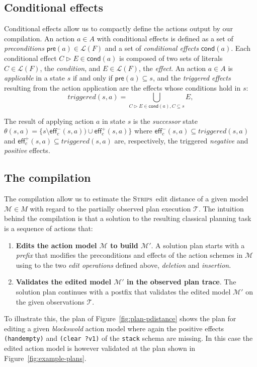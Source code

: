\documentclass[letterpaper]{article} %
\newcommand{\pre}{\mathsf{pre}}     %
\newcommand{\eff}{\mathsf{eff}}     %
\newcommand{\cond}{\mathsf{cond}}   %
\newcommand{\strips}{\textsc{Strips}}     %
\begin{document}
\subsection{Conditional effects}
Conditional effects allow us to compactly define the actions output by our compilation. An action $a\in A$ with conditional effects is defined as a set of {\em preconditions} $\pre(a)\in\mathcal{L}(F)$ and a set of {\em conditional effects} $\cond(a)$. Each conditional effect $C\rhd E\in\cond(a)$ is composed of two sets of literals $C\in\mathcal{L}(F)$, the {\em condition}, and $E\in\mathcal{L}(F)$, the {\em effect}. An action $a\in A$ is {\em applicable} in a state $s$ if and only if $\pre(a)\subseteq s$, and the {\em triggered effects} resulting from the action application are the effects whose conditions hold in $s$:
\[
triggered(s,a)=\bigcup_{C\rhd E\in\cond(a),C\subseteq s} E,
\]

The result of applying action $a$ in state $s$ is the {\em successor} state $\theta(s,a)=\{s\setminus\eff_c^-(s,a))\cup\eff_c^+(s,a)\}$ where $\eff_c^-(s,a)\subseteq triggered(s,a)$ and $\eff_c^+(s,a)\subseteq triggered(s,a)$ are, respectively, the triggered {\em negative} and {\em positive} effects.


\subsection{The compilation}
The compilation allow us to estimate the \strips\ edit distance of a given model $\mathcal{M}\in M$ with regard to the partially observed plan execution $\mathcal{T}$. The intuition behind the compilation is that a solution to the resulting classical planning task is a sequence of actions that:

\begin{enumerate}
\item {\bf Edits the action model $\mathcal{M}$ to build $\mathcal{M}'$}. A solution plan starts with a {\em prefix} that modifies the preconditions and effects of the action schemes in $\mathcal{M}$ using to the two {\em edit operations} defined above, {\em deletion} and {\em insertion}. 
\item {\bf Validates the edited model $\mathcal{M}'$ in the observed plan trace}. The solution plan continues with a postfix that validates the edited model $\mathcal{M}'$ on the given observations $\mathcal{T}$.
\end{enumerate}

To illustrate this, the plan of Figure~\ref{fig:plan-pdistance} shows the plan for editing a given {\em blockswold} action model where again the positive effects {\tt\small (handempty)} and {\tt\small (clear ?v1)} of the {\tt\small stack} schema are missing. In this case the edited action model is however validated at the plan shown in Figure~\ref{fig:example-plans}.
\end{document}
